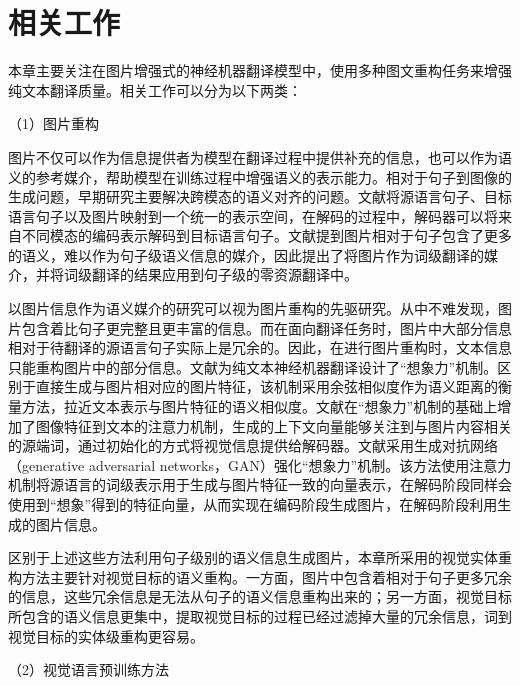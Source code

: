 \section{相关工作}
本章主要关注在图片增强式的神经机器翻译模型中，使用多种图文重构任务来增强纯文本翻译质量。相关工作可以分为以下两类：

{\sffamily （1）图片重构}

图片不仅可以作为信息提供者为模型在翻译过程中提供补充的信息，也可以作为语义的参考媒介，帮助模型在训练过程中增强语义的表示能力。相对于句子到图像的生成问题，早期研究主要解决跨模态的语义对齐的问题。文献\cite{54_DBLP:journals/mt/NakayamaN17}将源语言句子、目标语言句子以及图片映射到一个统一的表示空间，在解码的过程中，解码器可以将来自不同模态的编码表示解码到目标语言句子。文献\cite{55_DBLP:conf/ijcai/ChenJF19}提到图片相对于句子包含了更多的语义，难以作为句子级语义信息的媒介，因此提出了将图片作为词级翻译的媒介，并将词级翻译的结果应用到句子级的零资源翻译中。

以图片信息作为语义媒介的研究可以视为图片重构的先驱研究。从中不难发现，图片包含着比句子更完整且更丰富的信息。而在面向翻译任务时，图片中大部分信息相对于待翻译的源语言句子实际上是冗余的。因此，在进行图片重构时，文本信息只能重构图片中的部分信息。文献\cite{37_elliott-kadar-2017-imagination}为纯文本神经机器翻译设计了“想象力”机制。区别于直接生成与图片相对应的图片特征，该机制采用余弦相似度作为语义距离的衡量方法，拉近文本表示与图片特征的语义相似度。文献\cite{56_zhou-etal-2018-visual}在“想象力”机制的基础上增加了图像特征到文本的注意力机制，生成的上下文向量能够关注到与图片内容相关的源端词，通过初始化的方式将视觉信息提供给解码器。文献\cite{51_long-etal-2021-generative}采用生成对抗网络（generative adversarial networks，GAN）强化“想象力”机制。该方法使用注意力机制将源语言的词级表示用于生成与图片特征一致的向量表示，在解码阶段同样会使用到“想象”得到的特征向量，从而实现在编码阶段生成图片，在解码阶段利用生成的图片信息。

区别于上述这些方法利用句子级别的语义信息生成图片，本章所采用的视觉实体重构方法主要针对视觉目标的语义重构。一方面，图片中包含着相对于句子更多冗余的信息，这些冗余信息是无法从句子的语义信息重构出来的；另一方面，视觉目标所包含的语义信息更集中，提取视觉目标的过程已经过滤掉大量的冗余信息，词到视觉目标的实体级重构更容易。


{\sffamily （2）视觉语言预训练方法}


